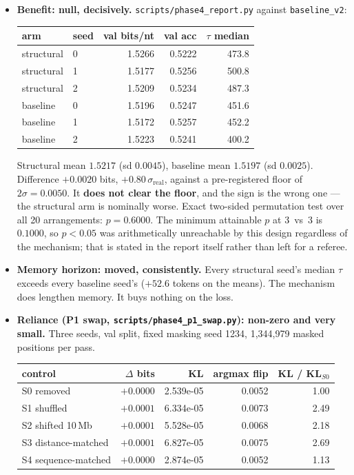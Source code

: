 \documentclass[11pt,a4paper]{article}
\newcommand{\code}[1]{\texttt{\small #1}}
\begin{document}
\begin{itemize}

\item \textbf{Benefit: null, decisively.} \code{scripts/phase4\_report.py}
against \code{baseline\_v2}:

\begin{center}
\begin{tabular}{llrrr}
\toprule
arm & seed & val bits/nt & val acc & $\tau$ median \\
\midrule
structural & 0 & 1.5266 & 0.5222 & 473.8 \\
structural & 1 & 1.5177 & 0.5256 & 500.8 \\
structural & 2 & 1.5209 & 0.5234 & 487.3 \\
baseline   & 0 & 1.5196 & 0.5247 & 451.6 \\
baseline   & 1 & 1.5172 & 0.5257 & 452.2 \\
baseline   & 2 & 1.5223 & 0.5241 & 400.2 \\
\bottomrule
\end{tabular}
\end{center}

Structural mean $1.5217$ (sd $0.0045$), baseline mean $1.5197$ (sd $0.0025$).
Difference $+0.0020$ bits, $+0.80\,\sigma_{\text{real}}$, against a
pre-registered floor of $2\sigma = 0.0050$. It \textbf{does not clear the
floor}, and the sign is the wrong one --- the structural arm is nominally worse.
Exact two-sided permutation test over all 20 arrangements: $p = 0.6000$. The
minimum attainable $p$ at 3~vs~3 is $0.1000$, so $p<0.05$ was arithmetically
unreachable by this design regardless of the mechanism; that is stated in the
report itself rather than left for a referee.

\item \textbf{Memory horizon: moved, consistently.} Every structural seed's
median $\tau$ exceeds every baseline seed's ($+52.6$ tokens on the means). The
mechanism does lengthen memory. It buys nothing on the loss.

\item \textbf{Reliance (P1 swap, \code{scripts/phase4\_p1\_swap.py}): non-zero
and very small.} Three seeds, val split, fixed masking seed 1234, 1{,}344{,}979
masked positions per pass.

\begin{center}
\begin{tabular}{lrrrr}
\toprule
control & $\Delta$ bits & KL & argmax flip & KL / KL$_{S0}$ \\
\midrule
S0 removed          & $+0.0000$ & 2.539e-05 & 0.0052 & 1.00 \\
S1 shuffled         & $+0.0001$ & 6.334e-05 & 0.0073 & 2.49 \\
S2 shifted 10\,Mb    & $+0.0001$ & 5.528e-05 & 0.0068 & 2.18 \\
S3 distance-matched & $+0.0001$ & 6.827e-05 & 0.0075 & 2.69 \\
S4 sequence-matched & $+0.0000$ & 2.874e-05 & 0.0052 & 1.13 \\
\bottomrule
\end{tabular}
\end{center}


\end{itemize}
\end{document}
